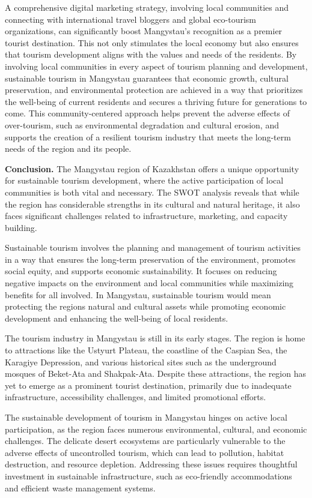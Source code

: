 \begin{multicols}{2}
A comprehensive digital marketing strategy, involving local communities
and connecting with international travel bloggers and global eco-tourism
organizations, can significantly boost Mangystau's recognition as a
premier tourist destination. This not only stimulates the local economy
but also ensures that tourism development aligns with the values and
needs of the residents. By involving local communities in every aspect
of tourism planning and development, sustainable tourism in Mangystau
guarantees that economic growth, cultural preservation, and
environmental protection are achieved in a way that prioritizes the
well-being of current residents and secures a thriving future for
generations to come. This community-centered approach helps prevent the
adverse effects of over-tourism, such as environmental degradation and
cultural erosion, and supports the creation of a resilient tourism
industry that meets the long-term needs of the region and its people.

{\bfseries Conclusion.} The Mangystau region of Kazakhstan offers a unique
opportunity for sustainable tourism development, where the active
participation of local communities is both vital and necessary. The SWOT
analysis reveals that while the region has considerable strengths in its
cultural and natural heritage, it also faces significant challenges
related to infrastructure, marketing, and capacity building.

Sustainable tourism involves the planning and management of tourism
activities in a way that ensures the long-term preservation of the
environment, promotes social equity, and supports economic
sustainability. It focuses on reducing negative impacts on the
environment and local communities while maximizing benefits for all
involved. In Mangystau, sustainable tourism would mean protecting the
region\textquotesingle s natural and cultural assets while promoting
economic development and enhancing the well-being of local residents.

The tourism industry in Mangystau is still in its early stages. The
region is home to attractions like the Ustyurt Plateau, the coastline of
the Caspian Sea, the Karagiye Depression, and various historical sites
such as the underground mosques of Beket-Ata and Shakpak-Ata. Despite
these attractions, the region has yet to emerge as a prominent tourist
destination, primarily due to inadequate infrastructure, accessibility
challenges, and limited promotional efforts.

The sustainable development of tourism in Mangystau hinges on active
local participation, as the region faces numerous environmental,
cultural, and economic challenges. The delicate desert ecosystems are
particularly vulnerable to the adverse effects of uncontrolled tourism,
which can lead to pollution, habitat destruction, and resource
depletion. Addressing these issues requires thoughtful investment in
sustainable infrastructure, such as eco-friendly accommodations and
efficient waste management systems.


\end{multicols}
